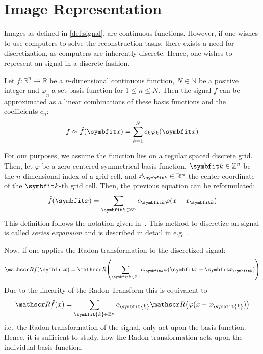 \chapter{Image Representation}\label{chap:e_representation}

Images as defined in \autoref{def:signal}, are continuous functions. However, if one wishes to use
computers to solve the reconstruction tasks, there exists a need for discretization, as computers
are inherently discrete. Hence, one wishes to represent an signal in a discrete fashion.

\begin{definition}
	\label{def:permissible_representation}
	Let \(f\colon \mathbb{R}^n \to \mathbb{R}\) be a \(n\)-dimensional continuous function,
	\(N \in \mathbb{N}\) be a positive integer and \(\varphi_n\) a set basis function for
	\(1 \leq n \leq N\). Then the signal \(f\) can be approximated as a linear combinations
	of these basis functions and the coefficients \(c_n\):
	\[ f \approx \near{f}(\mvec{x}) = \sum_{k=1}^{N} c_k \varphi_k(\mvec{x}) \]
\end{definition}


For our purposes, we assume the function lies on a regular spaced discrete grid. Then, let
\(\varphi\) be a zero centered symmetrical basis function, \(\mvec{k} \in \mathbb{Z}^n\) be the
\(n\)-dimensional index of a grid cell, and \(\vec{x}_{\mvec{k}} \in \mathbb{R}^n\) the center
coordinate of the \(\mvec{k}\)-th grid cell. Then, the previous equation can be reformulated:
\[ \near{f}(\mvec{x}) = \sum_{\mvec{k} \in \mathbb{Z}^n} c_{\mvec{k}} \varphi(x - x_{\mvec{k}}) \]
This definition follows the notation given in~\cite{momey_new_2011}. This method to discretize an
signal is called \textit{series expansion} and is described in detail in
e.g.\ \cite{herman_basis_2015}.

Now, if one applies the Radon transformation to the discretized signal: 
\[ \radon\near{f}(\mvec{x}) = \radon\left( \sum_{\mvec{k} \in \mathbb{Z}^n} c_{\mvec{k}} \varphi(\mvec{x} - \mvec{x}_{\mvec{k}}) \right) \]
Due to the linearity of the Radon Transform this is equivalent to
\[ \radon\hat{f}(x) = \sum_{\symbfit{k} \in \mathbb{Z}^n} c_{\symbfit{k}}\radon\left( \varphi(x - x_{\symbfit{k}}) \right) \]
i.e.\ the Radon transformation of the signal, only act upon the basis function. Hence, it is
sufficient to study, how the Radon transformation acts upon the individual basis function.

